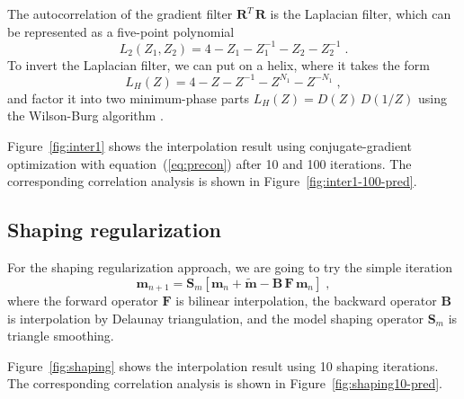 The autocorrelation of the gradient filter $\mathbf{R}^T\,\mathbf{R}$
is the Laplacian filter, which can be represented as a five-point polynomial
\begin{equation}
\label{eq:lap2}
L_2(Z_1,Z_2) = 4 - Z_1 - Z_1^{-1} - Z_2 - Z_2^{-1}\;.
\end{equation} 
To invert the Laplacian filter, we can put on a helix, where it takes
the form
\begin{equation}
\label{eq:lap1}
L_H(Z) = 4 - Z - Z^{-1} - Z^{N_1} - Z^{-N_1}\;,
\end{equation} 
and factor it into two minimum-phase parts $L_H(Z) = D(Z)\,D(1/Z)$
using the Wilson-Burg algorithm \cite[]{burg}. 


Figure~\ref{fig:inter1} shows the interpolation result using
conjugate-gradient optimization with equation~(\ref{eq:precon}) after
10 and 100 iterations. The corresponding correlation analysis is shown
in Figure~\ref{fig:inter1-100-pred}.


\subsection{Shaping regularization}

For the shaping regularization approach, we are going to try the simple iteration
\begin{equation}
\label{eq:mshape}
\mathbf{m}_{n+1} = \mathbf{S}_m\left[\mathbf{m}_{n} + \tilde{\mathbf{m}} -  \mathbf{B\,F\,m}_n\right]\;,
\end{equation}
where the forward operator $\mathbf{F}$ is bilinear interpolation, the
backward operator $\mathbf{B}$ is interpolation by Delaunay
triangulation, and the model shaping operator $\mathbf{S}_m$ is
triangle smoothing.

Figure~\ref{fig:shaping} shows the interpolation result using
10 shaping iterations. The corresponding correlation analysis is shown
in Figure~\ref{fig:shaping10-pred}.



